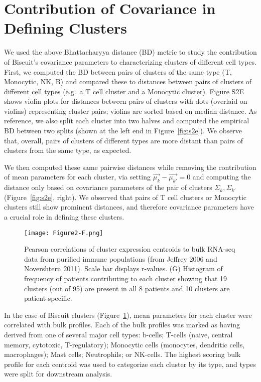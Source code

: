 \section{Contribution of Covariance in Defining Clusters}

We used the above Bhattacharyya distance (BD) metric to study the contribution of Biscuit's covariance parameters to characterizing clusters of different cell types.
First, we computed the BD between pairs of clusters of the same type (T, Monocytic, NK, B) and compared these to distances between pairs of clusters of different cell types (e.g.\ a T cell cluster and a Monocytic cluster).
Figure S2E shows violin plots for distances between pairs of clusters with dots (overlaid on violins) representing cluster pairs; violins are sorted based on median distance.
As reference, we also split each cluster into two halves and computed the empirical BD between two splits (shown at the left end in Figure~\ref{fig:s2e}).
We observe that, overall, pairs of clusters of different types are more distant than pairs of clusters from the same type, as expected.

We then computed these same pairwise distances while removing the contribution of mean parameters for each cluster, via setting \(\overrightarrow{\mu_{k}} - \overrightarrow{\mu_{k'}} = 0\) and computing the distance only based on covariance parameters of the pair of clusters \(\Sigma_{k},\Sigma_{k'}\) (Figure~\ref{fig:s2e}, right).
We observed that pairs of T cell clusters or Monocytic clusters still show prominent distances, and therefore covariance parameters have a crucial role in defining these clusters.


\begin{figure}
\centering
\texttt{[image: Figure2-F.png]}
\caption{Pearson correlations of cluster expression centroids to bulk RNA-seq data from purified immune populations (from Jeffrey 2006 and Novershtern 2011). Scale bar displays r-values.
(G) Histogram of frequency of patients contributing to each cluster showing that 19 clusters (out of 95) are present in all 8 patients and 10 clusters are patient-specific.
}
\label{fig:2f}
\end{figure}

In the case of Biscuit clusters (Figure~\ref{fig:2f}), mean parameters for each cluster were correlated with bulk profiles.
Each of the bulk profiles was marked as having derived from one of several major cell types: b-cells; T-cells (naive, central memory, cytotoxic, T-regulatory); Monocytic cells (monocytes, dendritic cells, macrophages); Mast cells; Neutrophils; or NK-cells.
The highest scoring bulk profile for each centroid was used to categorize each cluster by its type, and types were split for downstream analysis.

